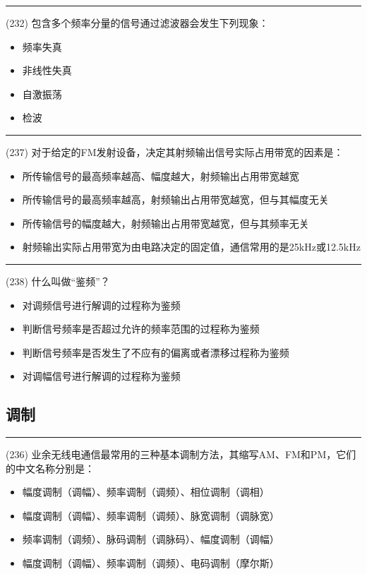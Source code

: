 \documentclass[twocolumn,hyperref,UTF8]{ctexart}  %
\begin{document}
\noindent\rule{0.5\textwidth}{1pt}
\heiti (232) 包含多个频率分量的信号通过滤波器会发生下列现象： \songti {\color{gray} [LK0572] }
\begin{itemize}
	\item  频率失真
	\item  非线性失真
	\item  自激振荡
	\item  检波
\end{itemize}


\noindent\rule{0.5\textwidth}{1pt}
\heiti (237) 对于给定的FM发射设备，决定其射频输出信号实际占用带宽的因素是： \songti {\color{gray} [LK0786] }
\begin{itemize}
	\item  所传输信号的最高频率越高、幅度越大，射频输出占用带宽越宽
	\item  所传输信号的最高频率越高，射频输出占用带宽越宽，但与其幅度无关
	\item  所传输信号的幅度越大，射频输出占用带宽越宽，但与其频率无关
	\item  射频输出实际占用带宽为由电路决定的固定值，通信常用的是25kHz或12.5kHz
\end{itemize}


\noindent\rule{0.5\textwidth}{1pt}
\heiti (238) 什么叫做“鉴频”？ \songti {\color{gray} [LK0791] }
\begin{itemize}
	\item  对调频信号{\color{LimeGreen}进行解调的过程}称为鉴频
	\item  判断信号频率是否超过允许的频率范围的过程称为鉴频
	\item  判断信号频率是否发生了不应有的偏离或者漂移过程称为鉴频
	\item  对调幅信号进行解调的过程称为鉴频
\end{itemize}


\clearpage
\subsection{调制}


\noindent\rule{0.5\textwidth}{1pt}
\heiti (236) 业余无线电通信最常用的三种基本调制方法，其缩写AM、FM和PM，它们的中文名称分别是： \songti {\color{gray} [LK0784] }
\begin{itemize}
	\item  幅度调制（调幅）、频率调制（调频）、相位调制（调相）
	\item  幅度调制（调幅）、频率调制（调频）、脉宽调制（调脉宽）
	\item  频率调制（调频）、脉码调制（调脉码）、幅度调制（调幅）
	\item  幅度调制（调幅）、频率调制（调频）、电码调制（摩尔斯）
\end{itemize}
\end{document}
